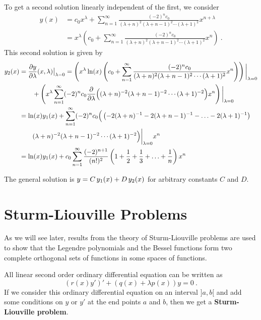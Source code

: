 \begin{egg}
To get a second solution linearly independent of the first, we
consider
\begin{align*}
y(x) &= c_0 x^\lambda + \sum_{n=1}^\infty 
\frac{(-2)^n c_0} {(\lambda +n)^2(\lambda +n-1)^2\cdots (\lambda + 1)^2}
x^{n+\lambda} \\
&= x^\lambda \left(c_0  + \sum_{n=1}^\infty 
\frac{(-2)^n c_0} {(\lambda +n)^2(\lambda +n-1)^2\cdots (\lambda + 1)^2}
x^n\right) \ .
\end{align*}
This second solution is given by
\begin{align*}
y_2(x) &= \frac{\partial{y}}{\partial \lambda}(x,\lambda)\big|_{\lambda=0}
= \left(x^\lambda\ln(x) \left(c_0  + \sum_{n=1}^\infty 
\frac{(-2)^n c_0} {(\lambda +n)^2(\lambda +n-1)^2\cdots (\lambda + 1)^2}
x^n\right)\right)\bigg|_{\lambda=0} \\
&\qquad + \left(x^\lambda \sum_{n=1}^\infty (-2)^n c_0
\frac{\partial}{\partial \lambda}{\Big((\lambda +n)^{-2}(\lambda +n-1)^{-2}\cdots
(\lambda + 1)^{-2}\Big)} x^n\right)\bigg|_{\lambda=0} \\
&= \ln(x) y_1(x) + \sum_{n=1}^\infty (-2)^n c_0 \Big(\left(
-2(\lambda +n)^{-1}-2(\lambda +n-1)^{-1} - \ldots -2 (\lambda + 1)^{-1}\right) \\
&\qquad (\lambda +n)^{-2}(\lambda +n-1)^{-2}\cdots (\lambda +
1)^{-2}\Big)\bigg|_{\lambda=0} x^n \\
&= \ln(x) y_1(x) + c_0 \sum_{n=1}^\infty \frac{(-2)^{n+1}}{(n!)^2}
\left(1 + \frac{1}{2} + \frac{1}{3} + \ldots + \frac{1}{n}\right) x^n
\end{align*}

The general solution is
$\displaystyle y = C\, y_1(x) + D\, y_2(x)$ for arbitrary constants
$C$ and $D$.
\end{egg}

\section{Sturm-Liouville Problems}

As we will see later, results from the theory of Sturm-Liouville
problems are used to show that the Legendre polynomials and the Bessel
functions form two complete orthogonal sets of functions in some
spaces of functions.

All linear second order ordinary differential equation can be written as
\[
(r(x) y')' + (q(x) + \lambda p(x)) y = 0 \ .
\]
If we consider this ordinary differential equation on an interval
$]a,b[$ and add some conditions on $y$ or $y'$ at the end points $a$
and $b$, then we get a
{\bfseries Sturm-Liouville problem}.

